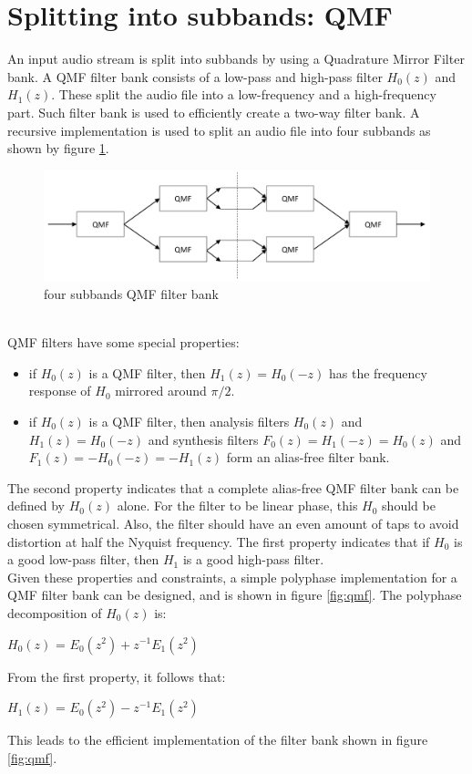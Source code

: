 \documentclass[a4paper]{article}
\begin{document}
\section{Splitting into subbands: QMF}
An input audio stream is split into subbands by using a Quadrature Mirror Filter bank.
A QMF filter bank consists of a low-pass and high-pass filter $H_0(z)$ and $H_1(z)$. These split the audio file into a low-frequency and a high-frequency part. Such filter bank is used to efficiently create a two-way filter bank. A recursive implementation is used to split an audio file into four subbands as shown by figure \ref{fig:qmfrecursive}.\\
\begin{figure}[hbt]
\includegraphics[width = \textwidth]{qmfrecursive}
\caption{four subbands QMF filter bank}
\label{fig:qmfrecursive}
\end{figure} \\
QMF filters have some special properties:
\begin{itemize}
\item if $H_0(z)$ is a QMF filter, then $H_1(z) = H_0(-z)$ has the frequency response of $H_0$ mirrored around $\pi/2$.
\item if $H_0(z)$ is a QMF filter, then analysis filters $H_0(z)$ and $H_1(z) = H_0(-z)$ and synthesis filters $F_0(z)=H_1(-z)=H_0(z)$ and $F_1(z)=-H_0(-z) = -H_1(z)$ form an alias-free filter bank.
\end{itemize}

The second property indicates that a complete alias-free QMF filter bank can be defined by $H_0(z)$ alone. For the filter to be linear phase, this $H_0$ should be chosen symmetrical. Also, the filter should have an even amount of taps to avoid distortion at half the Nyquist frequency. The first property indicates that if $H_0$ is a good low-pass filter, then $H_1$ is a good high-pass filter. \\

Given these properties and constraints, a simple polyphase implementation for a QMF filter bank can be designed, and is shown in figure \ref{fig:qmf}. The polyphase decomposition of $H_0(z)$ is:\\
\begin{center}
$H_0(z)$ = $E_0(z^2) + z^{-1} E_1(z^2)$ \\
\end{center}
From the first property, it follows that: \\
\begin{center}
$H_1(z)$ = $E_0(z^2) - z^{-1} E_1(z^2)$ \\
\end{center}
This leads to the efficient implementation of the filter bank shown in figure \ref{fig:qmf}.
\end{document}
